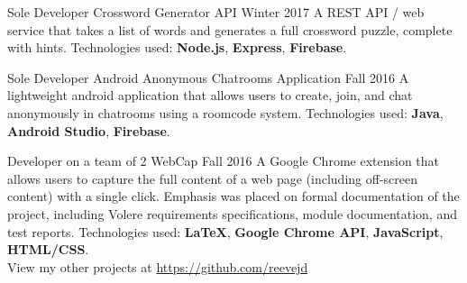 
\begin{cventries}
  
  \cventry
    {Sole Developer}
    {Crossword Generator API}
    {}
    {Winter 2017}
    {A REST API / web service that takes a list of words and generates a full crossword puzzle, complete with hints. Technologies used: \textbf{Node.js}, \textbf{Express}, \textbf{Firebase}.}
  
  \cventry
    {Sole Developer}
    {Android Anonymous Chatrooms Application}
    {}
    {Fall 2016}
    {A lightweight android application that allows users to create, join, and chat anonymously in chatrooms using a roomcode system. Technologies used: \textbf{Java}, \textbf{Android Studio}, \textbf{Firebase}.}
  
  \cventry
  {Developer on a team of 2}
  {WebCap}
  {}
  {Fall 2016}
  {A Google Chrome extension that allows users to capture the full content of a web page (including off-screen content) with a single click. Emphasis was placed on formal documentation of the project, including Volere requirements specifications, module documentation, and test reports. 
Technologies used: \textbf{LaTeX}, \textbf{Google Chrome API}, \textbf{JavaScript}, \textbf{HTML/CSS}.}\\[3mm]
        
View my other projects at \href{https://github.com/reevejd}{https://github.com/reevejd}
    
\end{cventries}
